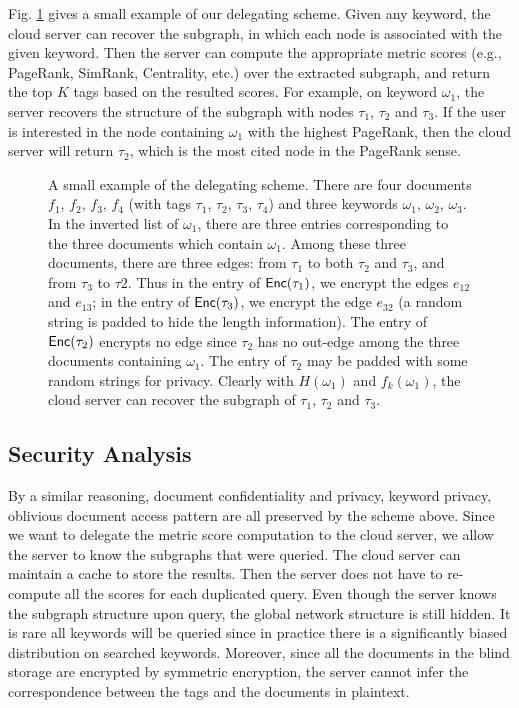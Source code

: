 \documentclass{IEEEtran}
\begin{document}
Fig. \ref{fig:gl} gives a small example of our delegating scheme. Given any keyword, the cloud server can recover the subgraph, in which each node is associated with the given keyword. Then the server can compute the appropriate metric scores (e.g., PageRank, SimRank, Centrality, etc.) over the extracted subgraph, and return the top $K$ tags based on the resulted scores. For example, on keyword $\omega_1$, the server recovers the structure of the subgraph with nodes $\tau_1$, $\tau_2$ and $\tau_3$. If the user is interested in the node containing $\omega_1$ with the highest PageRank, then the cloud server will return $\tau_2$, which is the most cited node in the PageRank sense.

\begin{figure}[!t]
\centering
\begin{tikzpicture}[scale=.9]

\end{tikzpicture}
\caption{A small example of the delegating scheme. There are four documents $f_1$, $f_2$, $f_3$, $f_4$ (with tags $\tau_1$, $\tau_2$, $\tau_3$, $\tau_4$) and three keywords $\omega_1$, $\omega_2$, $\omega_3$. In the inverted list of $\omega_1$, there are three entries corresponding to the three documents which contain $\omega_1$. Among these three documents, there are three edges: from $\tau_1$ to both $\tau_2$ and $\tau_3$, and from $\tau_3$ to $\tau2$. Thus in the entry of $\Enc(\tau_1)$, we encrypt the edges $e_{12}$ and $e_{13}$; in the entry of $\Enc(\tau_3)$, we encrypt the edge $e_{32}$ (a random string is padded to hide the length information). The entry of $\Enc(\tau_2)$ encrypts no edge since $\tau_2$ has no out-edge among the three documents containing $\omega_1$. The entry of $\tau_2$ may be padded with some random strings for privacy. Clearly with $H(\omega_1)$ and $f_k(\omega_1)$, the cloud server can recover the subgraph of $\tau_1$, $\tau_2$ and $\tau_3$.}
\label{fig:gl}
\end{figure}

\subsection{Security Analysis}
By a similar reasoning, document confidentiality and privacy, keyword privacy, oblivious document access pattern are all preserved by the scheme above. Since we want to delegate the metric score computation to the cloud server, we allow the server to know the subgraphs that were queried. The cloud server can maintain a cache to store the results. Then the server does not have to re-compute all the scores for each duplicated query. Even though the server knows the subgraph structure upon query, the global network structure is still hidden. It is rare all keywords will be queried since in practice there is a significantly biased distribution on searched keywords. Moreover, since all the documents in the blind storage are encrypted by symmetric encryption, the server cannot infer the correspondence between the tags and the documents in plaintext.
\end{document}
